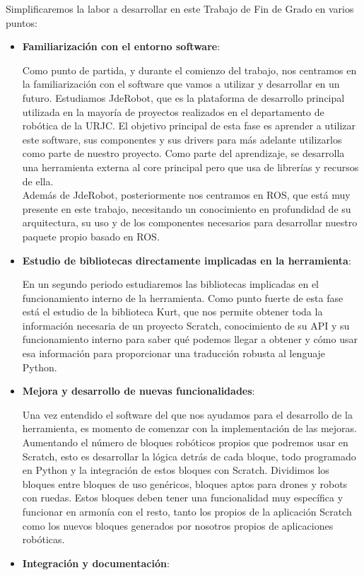 Simplificaremos la labor a desarrollar en este Trabajo de Fin de Grado en varios puntos:
\begin{itemize}
\item \textbf{Familiarización con el entorno software}: 

Como punto de partida, y durante el comienzo del trabajo, nos centramos en la familiarización con el software que vamos a utilizar y desarrollar en un futuro. Estudiamos JdeRobot, que es la plataforma de desarrollo principal utilizada en la mayoría de proyectos realizados en el departamento de robótica de la URJC. El objetivo principal de esta fase es aprender a utilizar este software, sus componentes y sus drivers para más adelante utilizarlos como parte de nuestro proyecto. Como parte del aprendizaje, se desarrolla una herramienta externa al core principal pero que usa de librerías y recursos de ella.\\

Además de JdeRobot, posteriormente nos centramos en ROS, que está muy presente en este trabajo, necesitando un conocimiento en profundidad de su arquitectura, su uso y de los componentes necesarios para desarrollar nuestro paquete propio basado en ROS.
\item \textbf{Estudio de bibliotecas directamente implicadas en la herramienta}: 

En un segundo periodo estudiaremos las bibliotecas implicadas en el funcionamiento interno de la herramienta. Como punto fuerte de esta fase está el estudio de la biblioteca Kurt, que nos permite obtener toda la información necesaria de un proyecto Scratch, conocimiento de su API y su funcionamiento interno para saber qué podemos llegar a obtener y cómo usar esa información para proporcionar una traducción robusta al lenguaje Python.
\item \textbf{Mejora y desarrollo de nuevas funcionalidades}: 

Una vez entendido el software del que nos ayudamos para el desarrollo de la herramienta, es momento de comenzar con la implementación de las mejoras. Aumentando el número de bloques robóticos propios que podremos usar en Scratch, esto es desarrollar la lógica detrás de cada bloque, todo programado en Python y la integración de estos bloques con Scratch. Dividimos los bloques entre bloques de uso genéricos, bloques aptos para drones y robots con ruedas. Estos bloques deben tener una funcionalidad muy específica y funcionar en armonía con el resto, tanto los propios de la aplicación Scratch como los nuevos bloques generados por nosotros propios de aplicaciones robóticas.
\item \textbf{Integración y documentación}: 


\end{itemize}
